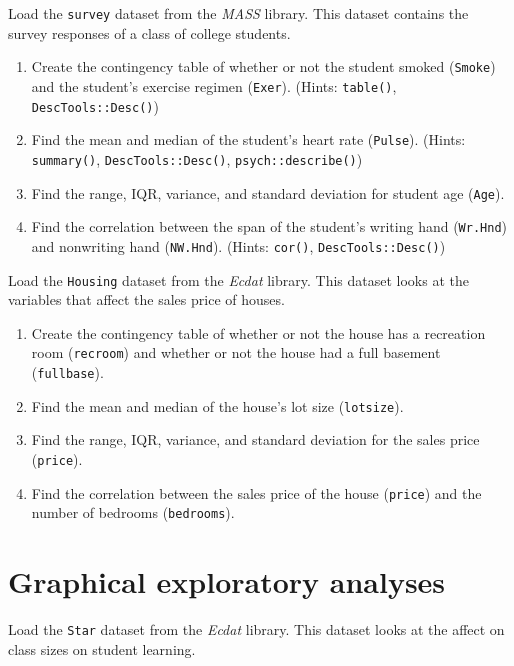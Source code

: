 \documentclass[
]{book}
\providecommand{\tightlist}{%
  \setlength{\itemsep}{0pt}\setlength{\parskip}{0pt}}
\begin{document}
Load the \texttt{survey} dataset from the \emph{MASS} library. This dataset contains the survey responses of a class of college students.

\begin{enumerate}
\def\labelenumi{\arabic{enumi}.}
\setcounter{enumi}{4}
\tightlist
\item
  Create the contingency table of whether or not the student smoked (\texttt{Smoke}) and the student's exercise regimen (\texttt{Exer}). (Hints: \texttt{table()}, \texttt{DescTools::Desc()})
\item
  Find the mean and median of the student's heart rate (\texttt{Pulse}). (Hints: \texttt{summary()}, \texttt{DescTools::Desc()}, \texttt{psych::describe()})
\item
  Find the range, IQR, variance, and standard deviation for student age (\texttt{Age}).
\item
  Find the correlation between the span of the student's writing hand (\texttt{Wr.Hnd}) and nonwriting hand (\texttt{NW.Hnd}). (Hints: \texttt{cor()}, \texttt{DescTools::Desc()})
\end{enumerate}

Load the \texttt{Housing} dataset from the \emph{Ecdat} library. This dataset looks at the variables that affect the sales price of houses.

\begin{enumerate}
\def\labelenumi{\arabic{enumi}.}
\setcounter{enumi}{8}
\tightlist
\item
  Create the contingency table of whether or not the house has a recreation room (\texttt{recroom}) and whether or not the house had a full basement (\texttt{fullbase}).
\item
  Find the mean and median of the house's lot size (\texttt{lotsize}).
\item
  Find the range, IQR, variance, and standard deviation for the sales price (\texttt{price}).
\item
  Find the correlation between the sales price of the house (\texttt{price}) and the number of bedrooms (\texttt{bedrooms}).
\end{enumerate}

\hypertarget{graphical-exploratory-analyses}{%
\section{Graphical exploratory analyses}\label{graphical-exploratory-analyses}}

Load the \texttt{Star} dataset from the \emph{Ecdat} library. This dataset looks at the affect on class sizes on student learning.
\end{document}
